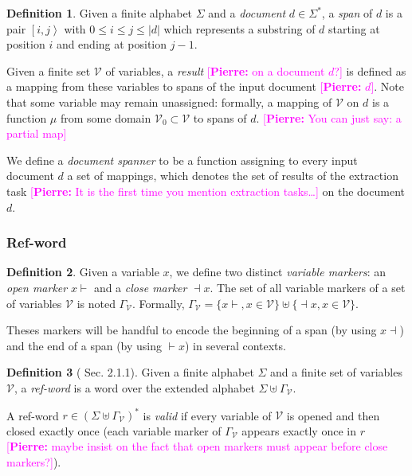 \documentclass[12px]{article}
\theoremstyle{definition}
\newtheorem{definition}{Definition}
\newcommand{\Span}[1]{\left[ #1 \right\rangle}
\newcommand{\pierre}[1]{\textcolor{magenta}{[\textbf{Pierre:} #1]}}
\begin{document}
        \begin{definition}
          Given a finite alphabet $\Sigma$ and a \textit{document} $d \in
          \Sigma^*$, a \textit{span} of $d$ is a pair $\Span{i, j}$ with $0
          \leq i \leq j \leq |d|$ which represents a substring of $d$ starting
          at position $i$ and ending at position $j - 1$.
        \end{definition}

        Given a finite set $\mathcal{V}$ of variables, a \textit{result}
        \pierre{on a document $d$?} is
        defined as a mapping from these variables to spans of the input
        document \pierre{$d$}.  Note that some variable may remain unassigned: formally, a
        mapping of $\mathcal{V}$ on $d$ is a function $\mu$ from some domain
        $\mathcal{V}_0 \subset \mathcal{V}$ to spans of $d$. \pierre{You
        can just say: a partial map}

        We define a \textit{document spanner} to be a function assigning to
        every input document $d$ a set of mappings, which denotes the set of
        results of the extraction task \pierre{It is the first time you
        mention extraction tasks\dots} on the document $d$.

      \subsubsection{Ref-word}

        \begin{definition}
          Given a variable $x$, we define two distinct \textit{variable
          markers}: an \textit{open marker} $x{\vdash}$ and a \textit{close
          marker} ${\dashv}x$. The set of all variable markers of a set of
          variables $\mathcal{V}$ is noted $\Gamma_\mathcal{V}$. Formally,
          $\Gamma_\mathcal{V} = \{x{\vdash}, x \in \mathcal{V}\} \uplus
          \{{\dashv}x, x \in \mathcal{V}\}$.
        \end{definition}

        Theses markers will be handful to encode the beginning of a span (by
        using $x{\dashv}$) and the end of a span (by using ${\vdash}x$) in
        several contexts.

        \begin{definition}[\cite{peterfreund} Sec. 2.1.1]
          Given a finite alphabet $\Sigma$ and a finite set of variables
          $\mathcal{V}$, a \textit{ref-word} is a word over the extended
          alphabet $\Sigma \uplus \Gamma_\mathcal{V}$.

          A ref-word $r \in {(\Sigma \uplus \Gamma_\mathcal{V})}^*$ is
          \textit{valid} if every variable of $\mathcal{V}$ is opened and then
          closed exactly once (each variable marker of $\Gamma_\mathcal{V}$
          appears exactly once in $r$ \pierre{maybe insist on the fact
          that open markers must appear before close markers?}).
        \end{definition}
\end{document}
